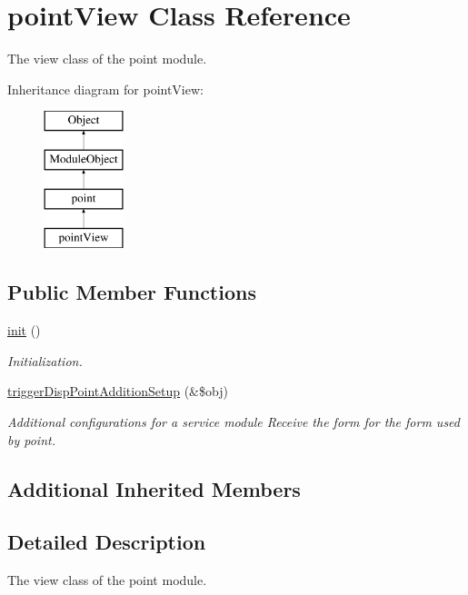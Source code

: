 \hypertarget{classpointView}{}\section{point\+View Class Reference}
\label{classpointView}


The view class of the point module.  


Inheritance diagram for point\+View\+:\begin{figure}[H]
\begin{center}
\leavevmode
\includegraphics[height=4.000000cm]{classpointView}
\end{center}
\end{figure}
\subsection*{Public Member Functions}
\begin{DoxyCompactItemize}
\item 
\hyperlink{classpointView_aa86b46a942ef2352a7db0019de88368a}{init} ()
\begin{DoxyCompactList}\small\item\em Initialization. \end{DoxyCompactList}\item 
\hyperlink{classpointView_a9249042127504b50e7c92cdff40a8ac5}{trigger\+Disp\+Point\+Addition\+Setup} (\&\$obj)
\begin{DoxyCompactList}\small\item\em Additional configurations for a service module Receive the form for the form used by point. \end{DoxyCompactList}\end{DoxyCompactItemize}
\subsection*{Additional Inherited Members}


\subsection{Detailed Description}
The view class of the point module. 

